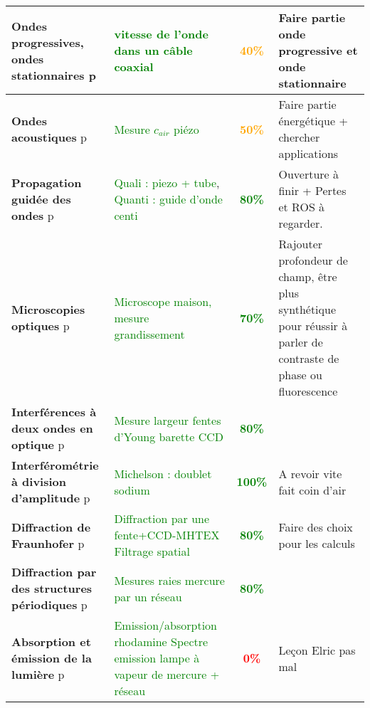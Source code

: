 \begin{changemargin}{-1.5cm}{-0cm}
\begin{center}
\begin{tabularx}{\paperwidth-2cm}{| X | X | c | X |}
\hline
  \textbf{Ondes progressives, ondes stationnaires} p\pageref{LP_OndesProgressives}~& \textcolor{green}{vitesse de l'onde dans un câble coaxial} & \textcolor{orange}{\textbf{40\%}} & Faire partie onde progressive et onde stationnaire \\
  \hline
  \textbf{Ondes acoustiques} p\pageref{LP_OndeAcoustique}~& \textcolor{green}{Mesure $c_{air}$ piézo} & \textcolor{orange}{\textbf{50\%}} & Faire partie énergétique + chercher applications \\
  \hline
  \textbf{Propagation guidée des ondes} p\pageref{LP_PropagationGuidee} & \textcolor{green}{Quali : piezo + tube}, \textcolor{green}{Quanti : guide d'onde centi}& \textcolor{green}{\textbf{80\%}} & Ouverture à finir + Pertes et ROS à regarder. \\
  \hline
  \textbf{Microscopies optiques} p\pageref{LP_Microscopie}~& \textcolor{green}{Microscope maison, mesure grandissement}~& \textcolor{green}{\textbf{70\%}} & Rajouter profondeur de champ, être plus synthétique pour réussir à parler de contraste de phase ou fluorescence \\
  \hline
  \textbf{Interférences à deux ondes en optique} p\pageref{LP_InterferencesDeuxOndes}~& \textcolor{green}{Mesure largeur fentes d'Young barette CCD} & \textcolor{green}{\textbf{80\%}} & \\
  \hline
  \textbf{Interférométrie à division d'amplitude} p\pageref{LP_DivisionAmplitude} & \textcolor{green}{Michelson : doublet sodium} & \textcolor{green}{\textbf{100\%}} & A revoir vite fait coin d'air \\
  \hline
  \textbf{Diffraction de Fraunhofer} p\pageref{LP_DiffractionFraunhofer} & \textcolor{green}{Diffraction par une fente+CCD-MHTEX} \textcolor{green}{Filtrage spatial} & \textcolor{green}{\textbf{80\%}} & Faire des choix pour les calculs \\
  \hline
  \textbf{Diffraction par des structures périodiques} p\pageref{LP_DiffractionPeriodique} & \textcolor{green}{Mesures raies mercure par un réseau} & \textcolor{green}{\textbf{80\%}} & \\
  \hline
  \textbf{Absorption et émission de la lumière} p\pageref{LP_Absorption} & \textcolor{green}{Emission/absorption rhodamine} \textcolor{green}{Spectre emission lampe à vapeur de mercure + réseau} & \textcolor{red}{\textbf{0\%}} & Leçon Elric pas mal \\

\end{tabularx}
\end{center}
\end{changemargin}
